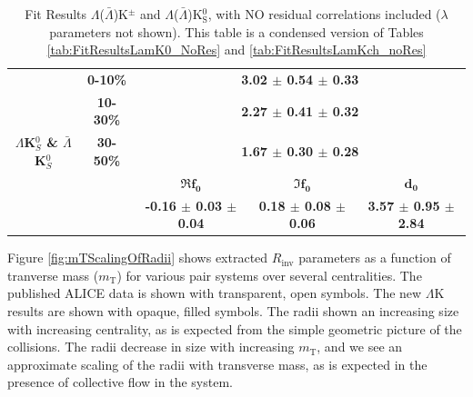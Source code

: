 \documentclass[../AnalysisNoteJBuxton.tex]{subfiles}
\begin{document}
\begin{landscape}
\begin{table}[htbp]
{\begin{tabular}{|c|c|c|c|c|}
  \multirow{5}{*}{\large \textbf{$\Lambda$K$^{0}_{S}$ \& $\bar{\Lambda}$K$^{0}_{S}$}}  
   &  \textbf{0-10\%} & \multicolumn{3}{c|}{\textbf{3.02 $\pm$ 0.54 $\pm$ 0.33}} \\  %
   & \textbf{10-30\%} & \multicolumn{3}{c|}{\textbf{2.27 $\pm$ 0.41 $\pm$ 0.32}} \\  %
   & \textbf{30-50\%} & \multicolumn{3}{c|}{\textbf{1.67 $\pm$ 0.30 $\pm$ 0.28}} \\  %
   \cline{2-5}   
   & & \large $\mathbf{\Re f_{0}}$ & \large $\mathbf{\Im f_{0}}$ & \large $\mathbf{d_{0}}$ \\
   \cline{3-5} 
   & & \textbf{-0.16 $\pm$ 0.03 $\pm$ 0.04} & \textbf{0.18 $\pm$ 0.08 $\pm$ 0.06} & \textbf{3.57 $\pm$ 0.95 $\pm$ 2.84} \\
  \hline
 \end{tabular}}
 \caption{Fit Results $\Lambda$($\bar{\Lambda}$)K$^{\pm}$ and $\Lambda$($\bar{\Lambda}$)K$^{0}_{\mathrm{S}}$, with NO residual correlations included ($\lambda$ parameters not shown).  This table is a condensed version of Tables \ref{tab:FitResultsLamK0_NoRes} and \ref{tab:FitResultsLamKch_noRes}} 
 \label{tab:FitResultsLamKCondensed_NoRes}
\end{table}

\end{landscape}
\pagestyle{plain}

Figure \ref{fig:mTScalingOfRadii} shows extracted $R_{\mathrm{inv}}$ parameters as a function of tranverse mass ($m_{\mathrm{T}}$) for various pair systems over several centralities.  The published ALICE data \cite{Adam:2015vja} is shown with transparent, open symbols.  The new $\Lambda$K results are shown with opaque, filled symbols.  The radii shown an increasing size with increasing centrality, as is expected from the simple geometric picture of the collisions.  The radii decrease in size with increasing $m_{\mathrm{T}}$, and we see an approximate scaling of the radii with transverse mass, as is expected in the presence of collective flow in the system.
\end{document}
